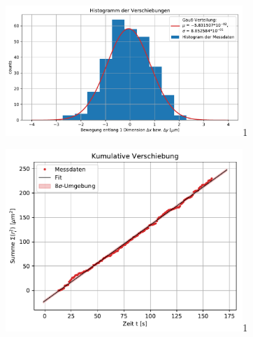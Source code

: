 \documentclass[a4paper,10pt]{article}
\begin{document}
\begin{figure}[htb]
  \centering
  \begin{annotate}{\includegraphics[width=0.8\textwidth]{223_Fig2.pdf}}{1}
  \end{annotate}
\caption{}
\label{fig:Fig2}
\end{figure}
\begin{figure}[htb]
  \centering
  \begin{annotate}{\includegraphics[width=0.8\textwidth]{223_Fig3.pdf}}{1}
  \end{annotate}
\caption{}
\label{fig:Fig3}
\end{figure}
\end{document}
